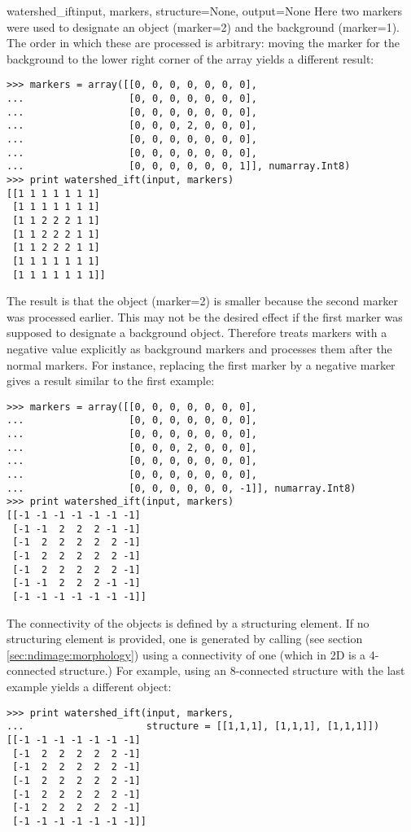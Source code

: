 \begin{funcdesc}{watershed_ift}{input, markers, structure=None, 
  output=None}
  Here two markers were used to designate an object (marker=2) and the
  background (marker=1).  The order in which these are processed is 
  arbitrary: moving the marker for the background to the lower right corner 
  of the array yields a different result:
\begin{verbatim}
>>> markers = array([[0, 0, 0, 0, 0, 0, 0],
...                  [0, 0, 0, 0, 0, 0, 0],
...                  [0, 0, 0, 0, 0, 0, 0],
...                  [0, 0, 0, 2, 0, 0, 0],
...                  [0, 0, 0, 0, 0, 0, 0],
...                  [0, 0, 0, 0, 0, 0, 0],
...                  [0, 0, 0, 0, 0, 0, 1]], numarray.Int8)
>>> print watershed_ift(input, markers)
[[1 1 1 1 1 1 1]
 [1 1 1 1 1 1 1]
 [1 1 2 2 2 1 1]
 [1 1 2 2 2 1 1]
 [1 1 2 2 2 1 1]
 [1 1 1 1 1 1 1]
 [1 1 1 1 1 1 1]]
\end{verbatim}
  The result is that the object (marker=2) is smaller because the second 
  marker was processed earlier. This may not be the desired effect if the 
  first marker was supposed to designate a background object. Therefore
   treats markers with a negative value explicitly 
  as background markers and processes them after the normal markers. For 
  instance, replacing the first marker by a negative marker gives a result 
  similar to the first example:
\begin{verbatim}
>>> markers = array([[0, 0, 0, 0, 0, 0, 0],
...                  [0, 0, 0, 0, 0, 0, 0],
...                  [0, 0, 0, 0, 0, 0, 0],
...                  [0, 0, 0, 2, 0, 0, 0],
...                  [0, 0, 0, 0, 0, 0, 0],
...                  [0, 0, 0, 0, 0, 0, 0],
...                  [0, 0, 0, 0, 0, 0, -1]], numarray.Int8)
>>> print watershed_ift(input, markers)
[[-1 -1 -1 -1 -1 -1 -1]
 [-1 -1  2  2  2 -1 -1]
 [-1  2  2  2  2  2 -1]
 [-1  2  2  2  2  2 -1]
 [-1  2  2  2  2  2 -1]
 [-1 -1  2  2  2 -1 -1]
 [-1 -1 -1 -1 -1 -1 -1]]
\end{verbatim}
  
  The connectivity of the objects is defined by a structuring element. If 
  no structuring element is provided, one is generated by calling
   (see section
  \ref{sec:ndimage:morphology}) using a connectivity of one (which in 2D is 
  a 4-connected structure.) For example, using an 8-connected structure 
  with the last example yields a different object:
\begin{verbatim}
>>> print watershed_ift(input, markers,
...                     structure = [[1,1,1], [1,1,1], [1,1,1]])
[[-1 -1 -1 -1 -1 -1 -1]
 [-1  2  2  2  2  2 -1]
 [-1  2  2  2  2  2 -1]
 [-1  2  2  2  2  2 -1]
 [-1  2  2  2  2  2 -1]
 [-1  2  2  2  2  2 -1]
 [-1 -1 -1 -1 -1 -1 -1]]
\end{verbatim}

\end{funcdesc}

